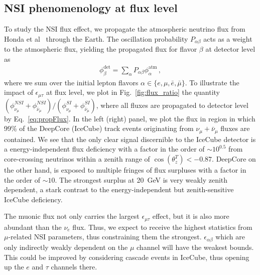 \documentclass{article}
\newcommand{\ztrue}{\ensuremath{\cos{(\theta_z^{T})}}}
\newcommand{\emt}{\ensuremath{\epsilon_{\mu\tau}}}
\renewcommand{\ne}{\nu_e}
\newcommand{\nm}{\nu_\mu}
\newcommand{\anm}{\bar\nu_\mu}
\begin{document}
\subsection{NSI phenomenology at flux level}\label{sec:nsiFluxEffects}
To study the NSI flux effect, we propagate the atmospheric neutrino flux from Honda et al~\cite{hondapaper} through the Earth.
The oscillation probability $P_{\alpha \beta}$ acts as a weight to the atmospheric flux, yielding the propagated flux for flavor $\beta$ at detector level as 
\begin{align}\label{eq:propFlux}
    \phi_\beta^\text{det} = \sum_\alpha P_{\alpha\beta} \phi_\alpha^\text{atm} \,,
\end{align}
where we sum over the initial lepton flavors $\alpha \in \{e,\mu, \bar{e}, \bar{\mu}\}$.
To illustrate the impact of $\emt$ at flux level, 
we plot in Fig.~\ref{fig:flux_ratio} the quantity $(\phi_{\nu_\mu}^{NSI} + \phi_{\bar\nu_\mu}^{NSI})/(\phi_{\nu_\mu}^{SI} + \phi_{\bar\nu_\mu}^{SI})$, 
where all fluxes are propagated to detector level by Eq.~\ref{eq:propFlux}. 
In the left (right) panel, we plot the flux in region in which 99\% of the 
DeepCore (IceCube) track events originating from $\nm + \anm$ fluxes are contained. We see that the only clear signal discernible to the IceCube detector
is a energy-independent flux deficiency with a factor in the order of $\sim 10^{0.5}$ from core-crossing neutrinos within a zenith range of $\ztrue < -0.87$. DeepCore on the other hand, 
is exposed to multiple fringes of flux surpluses with a factor in the order of $\sim 10$. The strongest surplus at \SI{20}{\GeV} is very weakly zenith dependent, a stark contrast to the
energy-independent but zenith-sensitive IceCube deficiency.

The muonic flux not only carries the largest $\emt$ effect, but it is also more abundant than the $\ne$ flux. Thus, we expect to receive the highest statistics from $\mu$-related NSI parameters,
thus constraining them the strongest. $\epsilon_{\alpha\beta}$ which are only indirectly weakly dependent on the $\mu$ channel will have the weakest bounds. This could be improved
by considering cascade events in IceCube, thus opening up the $e$ and $\tau$ channels there.
\end{document}
